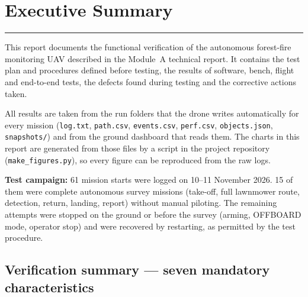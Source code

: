 \documentclass[10pt,a4paper]{article}
\newcommand{\file}[1]{\texttt{\small #1}}
\begin{document}
\section*{Executive Summary}
\vspace{-6pt}\rule{\textwidth}{0.4pt}

This report documents the functional verification of the autonomous forest-fire monitoring UAV described in the Module~A
technical report. It contains the test plan and procedures defined before testing, the results of software, bench, flight
and end-to-end tests, the defects found during testing and the corrective actions taken.

All results are taken from the run folders that the drone writes automatically for every mission
(\file{log.txt}, \file{path.csv}, \file{events.csv}, \file{perf.csv}, \file{objects.json}, \file{snapshots/}) and from the
ground dashboard that reads them. The charts in this report are generated from those files by a script in the project
repository (\file{make\_figures.py}), so every figure can be reproduced from the raw logs.

\textbf{Test campaign:} 61 mission starts were logged on 10--11 November 2026. 15 of them were complete autonomous
survey missions (take-off, full lawnmower route, detection, return, landing, report) without manual piloting. The
remaining attempts were stopped on the ground or before the survey (arming, OFFBOARD mode, operator stop) and were
recovered by restarting, as permitted by the test procedure.

\subsection*{Verification summary --- seven mandatory characteristics}
\end{document}
